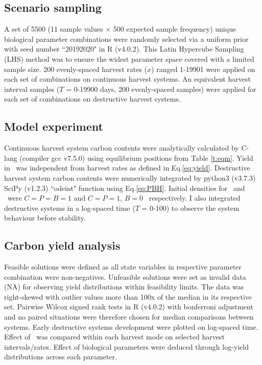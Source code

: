 \documentclass[../thesis.tex]{subfiles} %
\begin{document}
\subsection{Scenario sampling}
A set of 5500 (11 sample values $\times$ 500 expected sample frequency) unique biological parameter combinations were randomly selected via a uniform prior with seed number ``20192020" in R (v4.0.2).  This Latin Hypercube Sampling (LHS) method was to ensure the widest parameter space covered with a limited sample size.  200 evenly-spaced harvest rates ($x$) ranged 1-19901 \dayU were applied on each set of combinations on continuous harvest systems.  An equivalent harvest interval samples ($T$ = 0-19900 days, 200 evenly-spaced samples) were applied for each set of combinations on destructive harvest systems.

\subsection{Model experiment}
Continuous harvest system carbon contents were analytically calculated by C-lang (compiler gcc v7.5.0) using equilibrium positions from Table \ref{t:eqm}. Yield in \PoH\ was independent from harvest rates as defined in Eq.\ref{eq:yield}.  Destructive harvest system carbon contents were numerically integrated by python3 (v3.7.3) SciPy (v1.2.3) ``odeint" function using Eq.\ref{eq:PBH}.  Initial densities for \PBN\ and \PoN\ were $C=P=B=1$ and $C=P=1$, $B=0$ \den\ respectively.  I also integrated destructive systems in a log-spaced time ($T$ = 0-100) to observe the system behaviour before stability.

\subsection{Carbon yield analysis}
Feasible solutions were defined as all state variables in respective parameter combination were non-negatives.  Unfeasible solutions were set as invalid data (NA) for observing yield distributions within feasibility limits.  The data was right-skewed with outlier values more than 100x of the median in its respective set.  Pairwise Wilcox signed rank tests in R (v4.0.2) with bonferroni adjustment and no paired situations were therefore chosen for median comparisons between systems.  Early destructive systems development were plotted on log-spaced time.  Effect of \bac\ was compared within each harvest mode on selected harvest intervals/rates.  Effect of biological parameters were deduced through log-yield distributions across each parameter.
\end{document}

